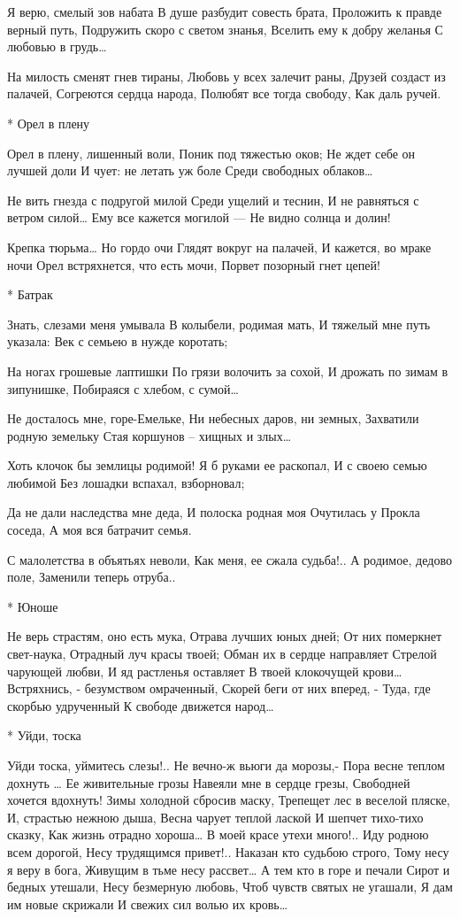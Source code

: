 Я верю, смелый зов набата
В душе разбудит совесть брата,
Проложить к правде верный путь,
Подружить скоро с светом знанья,
Вселить ему к добру желанья
С любовью в грудь…

На милость сменят гнев тираны,
Любовь у всех залечит раны,
Друзей создаст из палачей,
Согреются сердца народа,
Полюбят все тогда свободу,
Как даль ручей.


* Орел в плену

Орел в плену, лишенный воли,
Поник под тяжестью оков;
Не ждет себе он лучшей доли
И чует: не летать уж боле
Среди свободных облаков…

Не вить гнезда с подругой милой
Среди ущелий и теснин,
И не равняться с ветром силой…
Ему все кажется могилой —
Не видно солнца и долин!

Крепка тюрьма… Но гордо очи
Глядят вокруг на палачей,
И кажется, во мраке ночи
Орел встряхнется, что есть мочи,
Порвет позорный гнет цепей!


* Батрак

Знать, слезами меня умывала
В колыбели, родимая мать,
И тяжелый мне путь указала:
Век с семьею в нужде коротать;

На ногах грошевые лаптишки
По грязи волочить за сохой,
И дрожать по зимам в зипунишке,
Побираяся с хлебом, с сумой…

Не досталось мне, горе-Емельке,
Ни небесных даров, ни земных,
Захватили родную земельку
Стая коршунов – хищных и злых…

Хоть клочок бы землицы родимой!
Я б руками ее раскопал,
И с своею семью любимой
Без лошадки вспахал, взборновал;

Да не дали наследства мне деда,
И полоска родная моя
Очутилась у Прокла соседа,
А моя вся батрачит семья.

С малолетства в объятьях неволи,
Как меня, ее сжала судьба!..
А родимое, дедово поле,
Заменили теперь отруба..


* Юноше

Не верь страстям, оно есть мука,
Отрава лучших юных дней;
От них померкнет свет-наука,
Отрадный луч красы твоей;
Обман их в сердце направляет
Стрелой чарующей любви,
И яд растленья оставляет
В твоей клокочущей крови…
Встряхнись, - безумством омраченный,
Скорей беги от них вперед, -
Туда, где скорбью удрученный
К свободе движется народ…


* Уйди, тоска

Уйди тоска, уймитесь слезы!..
Не вечно-ж вьюги да морозы,-
Пора весне теплом дохнуть …
Ее живительные грозы
Навеяли мне в сердце грезы,
Свободней хочется вдохнуть!
Зимы холодной сбросив маску,
Трепещет лес в веселой пляске,
И, страстью нежною дыша,
Весна чарует теплой лаской
И шепчет тихо-тихо сказку,
Как жизнь отрадно хороша…
В моей красе утехи много!..
Иду родною всем дорогой,
Несу трудящимся привет!..
Наказан кто судьбою строго,
Тому несу я веру в бога,
Живущим в тьме несу рассвет…
А тем кто в горе и печали
Сирот и бедных утешали,
Несу безмерную любовь,
Чтоб чувств святых не угашали,
Я дам им новые скрижали
И свежих сил волью их кровь…


